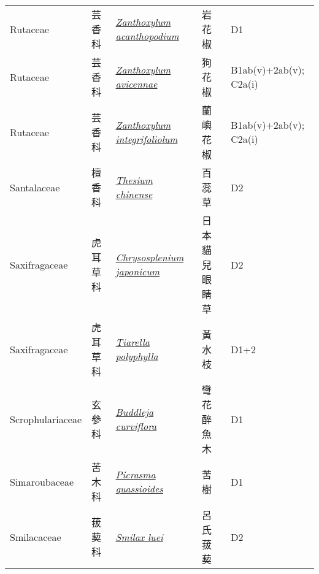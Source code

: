 {\begin{longtable}{L{2.5cm}L{2cm}L{5cm}L{2.5cm}L{3cm}}
    Rutaceae & 芸香科 & \href{http://www.theplantlist.org/tpl1.1/search?q=Zanthoxylum+acanthopodium}{\textit{Zanthoxylum acanthopodium} } & 岩花椒 & D1    \\
    Rutaceae & 芸香科 & \href{http://www.theplantlist.org/tpl1.1/search?q=Zanthoxylum+avicennae}{\textit{Zanthoxylum avicennae} } & 狗花椒 & B1ab(v)+2ab(v); C2a(i)    \\
    Rutaceae & 芸香科 & \href{http://www.theplantlist.org/tpl1.1/search?q=Zanthoxylum+integrifoliolum}{\textit{Zanthoxylum integrifoliolum} } & 蘭嶼花椒 & B1ab(v)+2ab(v); C2a(i)    \\
    Santalaceae & 檀香科 & \href{http://www.theplantlist.org/tpl1.1/search?q=Thesium+chinense}{\textit{Thesium chinense} } & 百蕊草 & D2    \\
    Saxifragaceae & 虎耳草科 & \href{http://www.theplantlist.org/tpl1.1/search?q=Chrysosplenium+japonicum}{\textit{Chrysosplenium japonicum} } & 日本貓兒眼睛草 & D2    \\
    Saxifragaceae & 虎耳草科 & \href{http://www.theplantlist.org/tpl1.1/search?q=Tiarella+polyphylla}{\textit{Tiarella polyphylla} } & 黃水枝 & D1+2    \\
    Scrophulariaceae & 玄參科 & \href{http://www.theplantlist.org/tpl1.1/search?q=Buddleja+curviflora}{\textit{Buddleja curviflora} } & 彎花醉魚木 & D1    \\
    Simaroubaceae & 苦木科 & \href{http://www.theplantlist.org/tpl1.1/search?q=Picrasma+quassioides}{\textit{Picrasma quassioides} } & 苦樹 & D1    \\
    Smilacaceae & 菝葜科 & \href{http://www.theplantlist.org/tpl1.1/search?q=Smilax+luei}{\textit{Smilax luei} } & 呂氏菝葜 & D2    \\

\end{longtable}}
